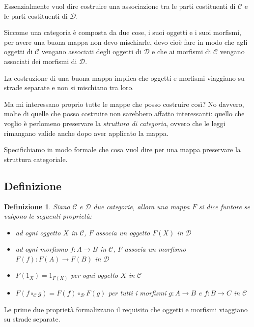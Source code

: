 \documentclass[12pt]{article}
\newtheorem{definition}{Definizione}
\begin{document}
Essenzialmente vuol dire costruire una associazione tra le parti costituenti di $\mathcal{C}$ e le parti costituenti di $\mathcal{D}$.

Siccome una categoria è composta da due cose, i suoi oggetti e i suoi morfismi, per avere una buona mappa non devo mischiarle,
devo cioè fare in modo che agli oggetti di $\mathcal{C}$ vengano associati degli oggetti di $\mathcal{D}$ e che ai morfismi di
$\mathcal{C}$ vengano associati dei morfismi di $\mathcal{D}$.

La costruzione di una buona mappa implica che oggetti e morfismi viaggiano su strade separate e non si mischiano tra loro.

Ma mi interessano proprio tutte le mappe che posso costruire così? No davvero, molte di quelle che posso costruire
non sarebbero affatto interessanti: quello che voglio è perlomeno preservare la \emph{struttura di categoria},
ovvero che le leggi rimangano valide anche dopo aver applicato la mappa.

Specifichiamo in modo formale che cosa vuol dire per una mappa preservare la struttura categoriale.

\subsection{Definizione}

\begin{definition}
Siano $\mathcal{C}$ e $\mathcal{D}$ due categorie, allora una mappa $F$ si dice \emph{funtore} se valgono le seguenti proprietà:

\begin{itemize}
  \item ad ogni oggetto $X$ in $\mathcal{C}$, $F$ associa un oggetto $F(X)$ in $\mathcal{D}$
  \item ad ogni morfismo $f: A \rightarrow B$ in $\mathcal{C}$, $F$ associa un morfismo $F(f): F(A) \rightarrow F(B)$ in $\mathcal{D}$
  \item $F(1_X) = 1_{F(X)}$ per ogni oggetto $X$ in $\mathcal{C}$
  \item $F(f \circ_\mathcal{C} g) = F(f) \circ_\mathcal{D} F(g)$ per tutti i morfismi $g: A \rightarrow B$ e $f: B \rightarrow C$ in $\mathcal{C}$
\end{itemize}

\end{definition}

Le prime due proprietà formalizzano il requisito che oggetti e morfismi viaggiano su strade separate.
\end{document}
